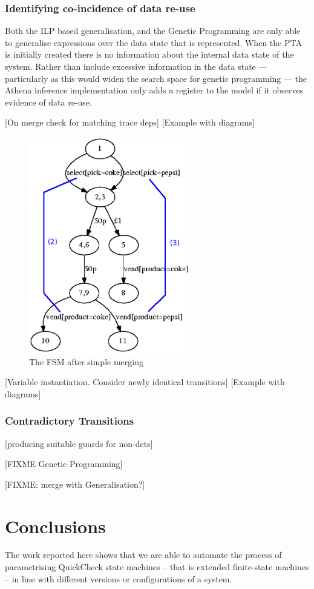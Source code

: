 \subsubsection{Identifying co-incidence of data re-use}
\label{IntertraceDependencies}

Both the ILP based generalisation, and the Genetic Programming are only able to generalise expressions over the data state that is represented. When the PTA is initially created there is no information about the internal data state of the system. Rather than include excessive information in the data state --- particularly as this would widen the search space for genetic programming --- the Athena inference implementation only adds a register to the model if it observes evidence of data re-use.



[On merge check for matching trace deps]
[Example with diagrams]

\begin{figure}[h]
\begin{center}
\includegraphics[width=7cm]{figures/efsm/vend2-withannotations.eps}
\caption{The FSM after simple merging}
\label{fig:FSM}
\end{center}
\end{figure}


[Variable instantiation. Consider newly identical transitions]
[Example with diagrams]

\subsubsection{Contradictory Transitions}
\label{Splitting}

[producing suitable guards for non-dets]

[FIXME Genetic Programming]


[FIXME: merge with Generalisation?]


\section{Conclusions}
\label{concs}

The work reported here shows that we are able to automate the process of parametrising QuickCheck state machines -- that 
is extended finite-state machines -- in line with different versions or configurations of a system.

